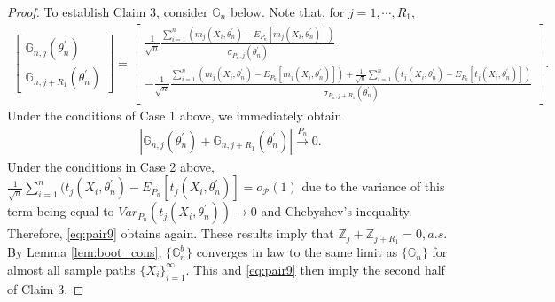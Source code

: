\documentclass[letterpaper,11pt]{article}
\theoremstyle{myplain}
\theoremstyle{mydefinition}
\theoremstyle{myremark}
\newcommand{\HH}{\mathbb{Z}}
\newcommand{\cP}{\mathcal{P}}
\numberwithin{equation}{section}
\numberwithin{figure}{section}
\begin{document}
\begin{appendices}
\begin{proof}
To establish Claim 3, consider $\mathbb G_{n}$ below. Note that, for $j=1,\cdots,R_1$,
\begin{align}
	\begin{bmatrix}
		\mathbb G_{n,j}(\theta^\prime_n)\\
			\mathbb G_{n,j+{R_1}}(\theta^\prime_n)
	\end{bmatrix}
=\begin{bmatrix}
		\frac{1}{\sqrt n}\frac{\sum_{i=1}^n (m_{j}(X_i,\theta^\prime_n)-E_{P_n}[m_{j}(X_i,\theta^\prime_n)])}{\sigma_{P_n,j}(\theta^\prime_n)}\\
		-\frac{1}{\sqrt n}\frac{\sum_{i=1}^n (m_{j}(X_i,\theta^\prime_n)-E_{P_n}[m_{j}(X_i,\theta^\prime_n)])+\frac{1}{\sqrt n}\sum_{i=1}^n (t_{j}(X_i,\theta^\prime_n)-E_{P_n}[t_{j}(X_i,\theta^\prime_n)])}{\sigma_{P_n,j+R_1}(\theta^\prime_n)}\label{eq:pair8}
	\end{bmatrix}.
\end{align}
Under the conditions of Case 1 above, we immediately obtain
\begin{align}
	|\mathbb G_{n,j}(\theta^\prime_n)+\mathbb G_{n,j+{R_1}}(\theta^\prime_n)|\stackrel{P_n}{\to}0.\label{eq:pair9}
\end{align}
Under the conditions in Case 2 above, $\frac{1}{\sqrt n}\sum_{i=1}^n (t_{j}(X_i,\theta^\prime_n)-E_{P_n}[t_{j}(X_i,\theta^\prime_n)]=o_{\cP}(1)$ due to the variance of this term being equal to $Var_{P_n}(t_{j}(X_i,\theta^\prime_n))\to 0$ and Chebyshev's inequality. Therefore, \eqref{eq:pair9} obtains again.
These results imply that $\HH_j+\HH_{j+R_1}=0, a.s.$ By Lemma \ref{lem:boot_cons}, $\{\mathbb G^b_n\}$ converges in law to the same limit as $\{\mathbb G_n\}$ for almost all sample paths $\{X_i\}_{i=1}^\infty$. This and \eqref{eq:pair9} then imply the second half of Claim 3.



\end{proof}
\end{appendices}
\end{document}
